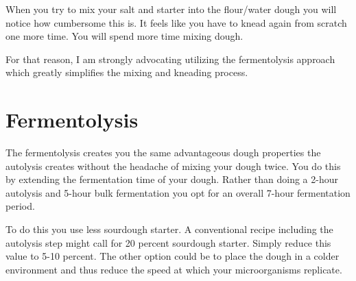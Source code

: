 When you try to mix your salt and starter into the flour/water dough you will
notice how cumbersome this is. It feels like you have to knead again from scratch
one more time. You will spend more time mixing dough.

For that reason, I am strongly advocating utilizing the fermentolysis approach
which greatly simplifies the mixing and kneading process.

\section{Fermentolysis}

The fermentolysis creates you the same advantageous dough properties the
autolysis creates without the headache of mixing your dough twice. You do this
by extending the fermentation time of your dough. Rather than doing a 2-hour
autolysis and 5-hour bulk fermentation you opt for an overall 7-hour
fermentation period.

To do this you use less sourdough starter. A conventional recipe including the
autolysis step might call for 20 percent sourdough starter. Simply reduce this
value to 5-10 percent. The other option could be to place the dough in a colder
environment and thus reduce the speed at which your microorganisms replicate.

